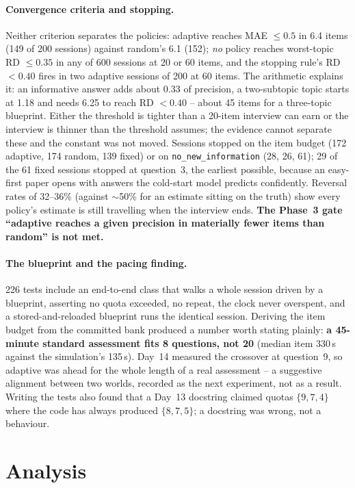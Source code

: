 \documentclass{tietreport}
\begin{document}
\paragraph{Convergence criteria and stopping.} Neither criterion separates the policies:
adaptive reaches MAE $\le0.5$ in 6.4 items (149 of 200 sessions) against random's 6.1 (152);
\emph{no} policy reaches worst-topic RD $\le0.35$ in any of 600 sessions at 20 or 60 items, and
the stopping rule's RD $<0.40$ fires in two adaptive sessions of 200 at 60 items. The arithmetic
explains it: an informative answer adds about 0.33 of precision, a two-subtopic topic starts at
1.18 and needs 6.25 to reach RD $<0.40$ -- about 45 items for a three-topic blueprint. Either the
threshold is tighter than a 20-item interview can earn or the interview is thinner than the
threshold assumes; the evidence cannot separate these and the constant was not moved. Sessions
stopped on the item budget (172 adaptive, 174 random, 139 fixed) or on
\texttt{no\_new\_information} (28, 26, 61); 29 of the 61 fixed sessions stopped at question~3, the
earliest possible, because an easy-first paper opens with answers the cold-start model predicts
confidently. Reversal rates of 32--36\% (against $\sim$50\% for an estimate sitting on the truth)
show every policy's estimate is still travelling when the interview ends. \textbf{The Phase~3 gate
``adaptive reaches a given precision in materially fewer items than random'' is not met.}

\paragraph{The blueprint and the pacing finding.} 226 tests include an end-to-end class that
walks a whole session driven by a blueprint, asserting no quota exceeded, no repeat, the clock
never overspent, and a stored-and-reloaded blueprint runs the identical session. Deriving the
item budget from the committed bank produced a number worth stating plainly: \textbf{a
45-minute standard assessment fits 8 questions, not 20} (median item 330\,s against the
simulation's 135\,s). Day~14 measured the crossover at question~9, so adaptive was ahead for
the whole length of a real assessment -- a suggestive alignment between two worlds, recorded as
the next experiment, not as a result. Writing the tests also found that a Day~13 docstring
claimed quotas $\{9,7,4\}$ where the code has always produced $\{8,7,5\}$; a docstring was wrong,
not a behaviour.

\section{Analysis}
\label{sec:gates}
\end{document}

